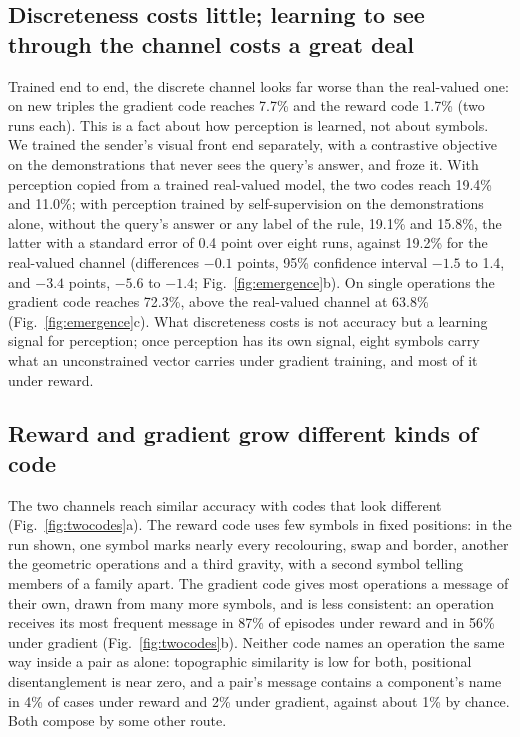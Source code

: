 \documentclass{nature}
\begin{document}
\subsection*{Discreteness costs little; learning to see through the channel costs a great deal}

Trained end to end, the discrete channel looks far worse than the real-valued one: on new triples the gradient
code reaches 7.7\% and the reward code 1.7\% (two runs each). This is a fact about how perception is learned, not
about symbols. We trained the sender's visual front end separately, with a contrastive objective on the
demonstrations that never sees the query's answer, and froze it. With perception copied from a trained real-valued
model, the two codes reach 19.4\% and 11.0\%; with perception trained by self-supervision on the demonstrations
alone, without the query's answer or any label of the rule, 19.1\% and 15.8\%, the latter with a standard error of
0.4 point over eight runs, against 19.2\% for the real-valued channel (differences $-0.1$ points, 95\% confidence
interval $-1.5$ to 1.4, and $-3.4$ points, $-5.6$ to $-1.4$; Fig.~\ref{fig:emergence}b). On single operations the
gradient code reaches 72.3\%, above the real-valued channel at 63.8\% (Fig.~\ref{fig:emergence}c). What
discreteness costs is not accuracy but a learning signal for perception; once perception has its own signal,
eight symbols carry what an unconstrained vector carries under gradient training, and most of it under reward.

\subsection*{Reward and gradient grow different kinds of code}

The two channels reach similar accuracy with codes that look different (Fig.~\ref{fig:twocodes}a). The reward code
uses few symbols in fixed positions: in the run shown, one symbol marks nearly every recolouring, swap and border,
another the geometric operations and a third gravity, with a second symbol telling members of a family apart. The
gradient code gives most operations a message of their own, drawn from many more symbols, and is less consistent:
an operation receives its most frequent message in 87\% of episodes under reward and in 56\% under gradient
(Fig.~\ref{fig:twocodes}b). Neither code names an operation the same way inside a pair as alone: topographic
similarity is low for both, positional disentanglement is near zero, and a pair's message contains a component's
name in 4\% of cases under reward and 2\% under gradient, against about 1\% by chance. Both compose by some other
route.
\end{document}
